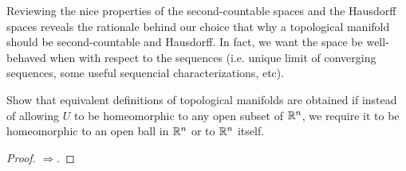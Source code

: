 Reviewing the nice properties of the second-countable spaces and the Hausdorff spaces reveals the rationale behind our choice that why a topological manifold should be second-countable and Hausdorff. In fact, we want the space be well-behaved when with respect to the sequences (i.e. unique limit of converging sequences, some useful sequencial characterizations, etc).


\begin{problem}
	Show that equivalent definitions of topological manifolds are obtained if instead of allowing $ U $ to be homeomorphic to any open subset of $ \mathbb{R}^n $, we require it to be homeomorphic to an open ball in $ \mathbb{R}^n $ or to $ \mathbb{R}^n $ itself.
\end{problem}
\begin{proof}
	$ \boxed{\Longrightarrow} $.
\end{proof}










